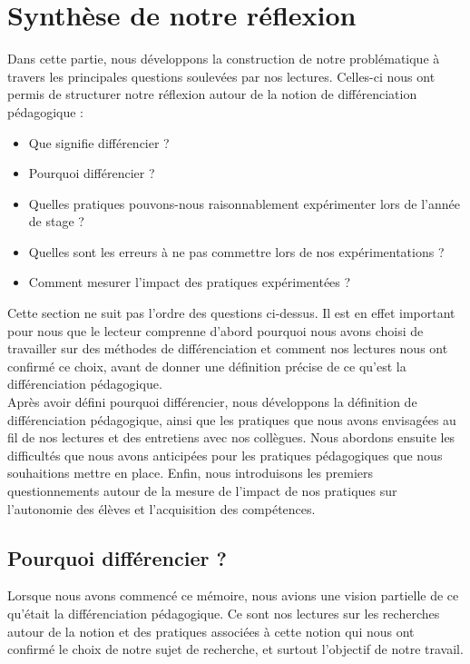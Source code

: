 \section{Synthèse de notre réflexion}
Dans cette partie, nous développons la construction de notre problématique à travers les principales questions soulevées par nos lectures. Celles-ci nous ont permis de structurer notre réflexion autour de la notion de différenciation pédagogique :

\begin{itemize}
  \item Que signifie différencier ?
  \item Pourquoi différencier ?
  \item Quelles pratiques pouvons-nous raisonnablement expérimenter lors de l'année de stage ?
  \item Quelles sont les erreurs à ne pas commettre lors de nos expérimentations ?
  \item Comment mesurer l'impact des pratiques expérimentées ?
\end{itemize}

Cette section ne suit pas l'ordre des questions ci-dessus. Il est en effet important pour nous que le lecteur comprenne d'abord pourquoi nous avons choisi de travailler sur des méthodes de différenciation et comment nos lectures nous ont confirmé ce choix, avant de donner une définition précise de ce qu'est la différenciation pédagogique.\\
Après avoir défini pourquoi différencier, nous développons la définition de différenciation pédagogique, ainsi que les pratiques que nous avons envisagées au fil de nos lectures et des entretiens avec nos collègues. Nous abordons ensuite les difficultés que nous avons anticipées pour les pratiques pédagogiques que nous souhaitions mettre en place. Enfin, nous introduisons les premiers questionnements autour de la mesure de l'impact de nos pratiques sur l'autonomie des élèves et l'acquisition des compétences.\\

\subsection{Pourquoi différencier ?}


Lorsque nous avons commencé ce mémoire, nous avions une vision partielle de ce qu'était la différenciation pédagogique. Ce sont nos lectures sur les recherches autour de la notion et des pratiques associées à cette notion qui nous ont confirmé le choix de notre sujet de recherche, et surtout l'objectif de notre travail.

